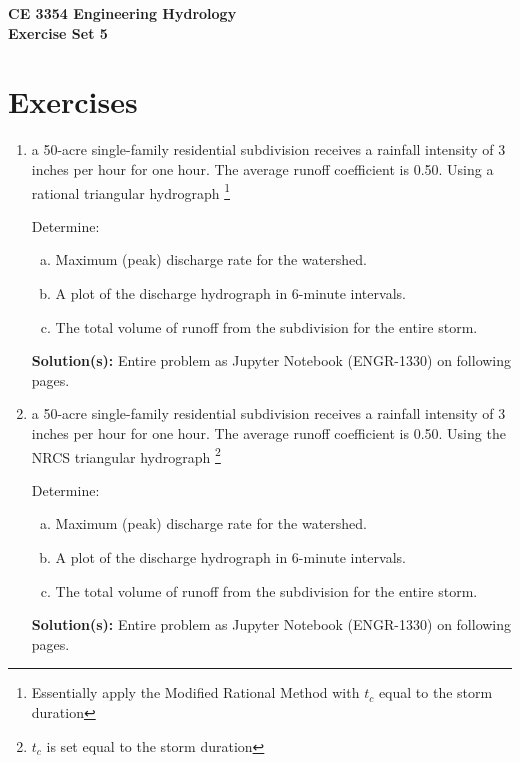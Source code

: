 \documentclass[12pt]{article}
\begin{document}
\begin{center}
{\textbf{{ CE 3354 Engineering Hydrology} \\ {Exercise Set 5}}}
\end{center}

\section*{\small{Exercises}}

\begin{enumerate}

\item a 50-acre single-family residential subdivision receives a rainfall intensity of 3 inches per hour for one hour.  The average runoff coefficient is 0.50.  Using a rational triangular hydrograph \footnote{Essentially apply the Modified Rational Method with $t_c$ equal to the storm duration} 

Determine:
    \begin{enumerate}[a)]
        \item Maximum (peak) discharge rate for the watershed.
        \item A plot of the discharge hydrograph in 6-minute intervals.
        \item The total volume of runoff from the subdivision for the entire storm.
    \end{enumerate}

\textbf{Solution(s):}
Entire problem as Jupyter Notebook (ENGR-1330) on following pages.


\clearpage

\item a 50-acre single-family residential subdivision receives a rainfall intensity of 3 inches per hour for one hour.  The average runoff coefficient is 0.50.  Using the NRCS triangular hydrograph \footnote{$t_c$ is set equal to the storm duration} 

Determine:
    \begin{enumerate}[a)]
        \item Maximum (peak) discharge rate for the watershed.
        \item A plot of the discharge hydrograph in 6-minute intervals.
        \item The total volume of runoff from the subdivision for the entire storm.
    \end{enumerate}

\textbf{Solution(s):}
Entire problem as Jupyter Notebook (ENGR-1330) on following pages.



\end{enumerate}
\end{document}
